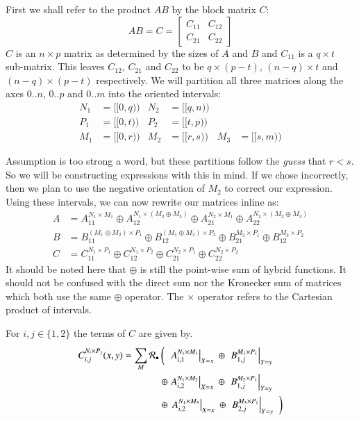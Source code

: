 First we shall refer to the product $AB$ by the block matrix $C$:
\begin{equation}
	AB = C = \begin{bmatrix} C_{11} & C_{12} \\ C_{21} & C_{22} \end{bmatrix}
\end{equation}
$C$ is an $n \times p$ matrix as determined by the sizes of $A$ and $B$ and $C_{11}$ is a $q \times t$ sub-matrix.
This leaves $C_{12}$, $C_{21}$ and $C_{22}$ to be $q \times (p-t)$, $(n-q) \times t$ and $(n-q) \times (p-t)$ respectively.
We will partition all three matrices along the axes $0.. n$, $0..p$ and $0..m$ into the oriented intervals:
\begin{align*}
	N_1 	&= [\![0, q)\!) 	& N_2 	&= [\![q, n)\!) 	\\
	P_1 	&= [\![0, t)\!) 	& P_2 	&= [\![t, p)\!) 	\\
	M_1 	&= [\![0, r)\!) 	& M_2 	&= [\![r, s)\!) 	& M_3 	&= [\![s, m)\!)
\end{align*}


Assumption is too strong a word, but these partitions follow the \emph{guess} that $r<s$.
So we will be constructing expressions with this in mind. 
If we chose incorrectly, then we plan to use the negative orientation of $M_2$ to correct our expression.
Using these intervals, we can now rewrite our matrices inline as:
\begin{align}
	A & =	A_{11}^{N_1 \times M_1} \oplus A_{12}^{N_1 \times (M_2 \oplus M_3)} \oplus 
			A_{21}^{N_2 \times M_1} \oplus A_{22}^{N_2 \times (M_2 \oplus M_3)} \\
	B & =	B_{11}^{(M_1 \oplus M_2) \times P_1} \oplus B_{12}^{(M_1 \oplus M_2) \times P_2} \oplus 
			B_{21}^{M_3 \times P_1} \oplus B_{12}^{M_3 \times P_2}\\
	\label{eqn:2x2multiplicationblocks}
	C & =	C_{11}^{N_1 \times P_1} \oplus C_{12}^{N_1 \times P_2} \oplus
			C_{21}^{N_2 \times P_1} \oplus C_{22}^{N_2 \times P_2}
\end{align}
It should be noted here that $\oplus$ is still the point-wise sum of hybrid functions.
It should not be confused with the direct sum nor the Kronecker sum of matrices which both use the same $\oplus$ operator.
The $\times$ operator refers to the Cartesian product of intervals. 


For $i,j \in \{ 1,2 \}$ the terms of $C$ are given by.
\begin{align}
	\label{eqn:2x2multiplication}
	C_{i,j}^{N_i \times P_j} (x,y) = \sum_{M} \R[\smallmult]  
		&\left( \;\;
			\left. 	A_{i,1}^{N_1 \times M_1}	\right|_{X=x} \;\oplus\;
			\left.	B_{1,j}^{M_1 \times P_1}	\right|_{Y=y} 
		\right.  \notag \\
	 	&\oplus
	 		\left.	A_{i,2}^{N_1 \times M_2}	\right|_{X=x} \;\oplus\;
			\left. 	B_{1,j}^{M_2 \times P_1}	\right|_{Y=y} 
		\notag \\
		&\oplus\left.
			\left.	A_{i,2}^{N_1 \times M_3}	\right|_{X=x} \;\oplus\;
			\left. 	B_{2,j}^{M_3 \times P_1}	\right|_{Y=y}
		\;\;\right)
\end{align}


